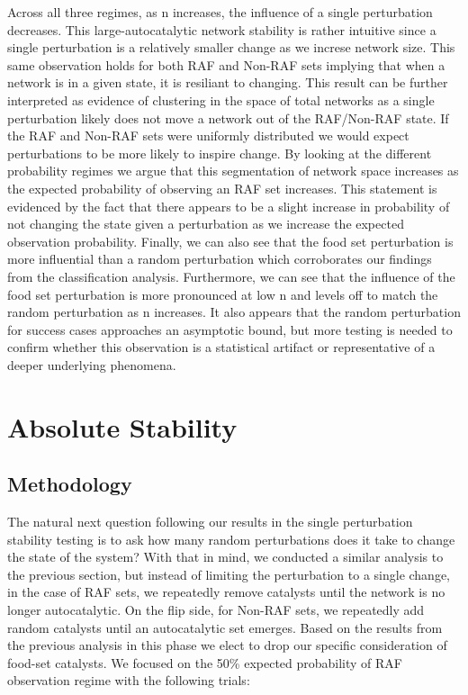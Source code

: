 \documentclass[11pt]{article}
\begin{document}
Across all three regimes, as n increases, the influence of a single perturbation decreases. This large-autocatalytic network stability is rather intuitive since a single perturbation is a relatively smaller change as we increse network size.
This same observation holds for both RAF and Non-RAF sets implying that when a network is in a given state, it is resiliant to changing. 
This result can be further interpreted as evidence of clustering in the space of total networks as a single perturbation likely does not move a network out of the RAF/Non-RAF state.
If the RAF and Non-RAF sets were uniformly distributed we would expect perturbations to be more likely to inspire change. 
By looking at the different probability regimes we argue that this segmentation of network space increases as the expected probability of observing an RAF set increases. 
This statement is evidenced by the fact that there appears to be a slight increase in probability of not changing the state given a perturbation as we increase the expected observation probability.
Finally, we can also see that the food set perturbation is more influential than a random perturbation which corroborates our findings from the classification analysis. 
Furthermore, we can see that the influence of the food set perturbation is more pronounced at low n and levels off to match the random perturbation as n increases. 
It also appears that the random perturbation for success cases approaches an asymptotic bound, but more testing is needed to confirm whether this observation is a statistical artifact or representative of a deeper underlying phenomena.


\section{Absolute Stability}


\subsection{Methodology}

The natural next question following our results in the single perturbation stability testing is to ask how many random perturbations does it take to change the state of the system? 
With that in mind, we conducted a similar analysis to the previous section, but instead of limiting the perturbation to a single change, in the case of RAF sets, we repeatedly remove catalysts until the network is no longer autocatalytic. 
On the flip side, for Non-RAF sets, we repeatedly add random catalysts until an autocatalytic set emerges. 
Based on the results from the previous analysis in this phase we elect to drop our specific consideration of food-set catalysts.
We focused on the 50\% expected probability of RAF observation regime with the following trials:
\end{document}
